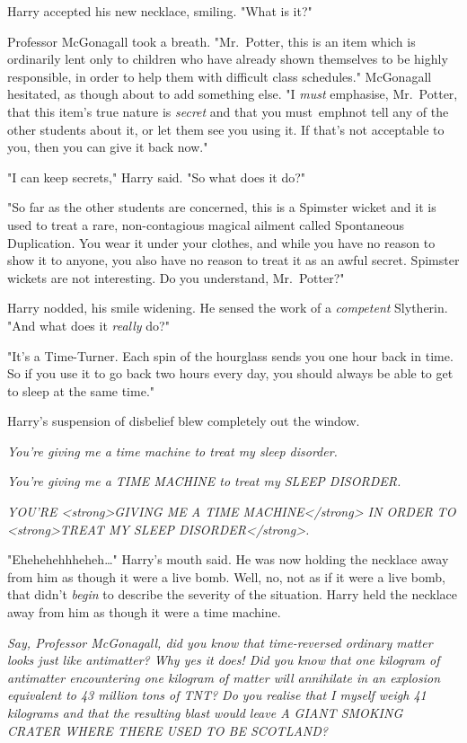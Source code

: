 Harry accepted his new necklace, smiling. "What is it?"

Professor McGonagall took a breath. "Mr.~Potter, this is an item which is 
ordinarily lent only to children who have already shown themselves to be highly 
responsible, in order to help them with difficult class schedules." McGonagall 
hesitated, as though about to add something else. "I \emph{must} emphasise, 
Mr.~Potter, that this item's true nature is \emph{secret} and that you 
must\ emph{not} tell any of the other students about it, or let them see you 
using it. If that's not acceptable to you, then you can give it back now."

"I can keep secrets," Harry said. "So what does it do?"

"So far as the other students are concerned, this is a Spimster wicket and it 
is used to treat a rare, non-contagious magical ailment called Spontaneous 
Duplication. You wear it under your clothes, and while you have no reason to 
show it to anyone, you also have no reason to treat it as an awful secret. 
Spimster wickets are not interesting. Do you understand, Mr.~Potter?"

Harry nodded, his smile widening. He sensed the work of a \emph{competent} 
Slytherin. "And what does it \emph{really} do?"

"It's a Time-Turner. Each spin of the hourglass sends you one hour back in 
time. So if you use it to go back two hours every day, you should always be 
able to get to sleep at the same time."

Harry's suspension of disbelief blew completely out the window.

\emph{You're giving me a time machine to treat my sleep disorder.}

\emph{You're giving me a TIME MACHINE to treat my SLEEP DISORDER.}

\emph{YOU'RE <strong>GIVING ME A TIME MACHINE</strong> IN ORDER TO 
<strong>TREAT MY SLEEP DISORDER</strong>.}

"Ehehehehhheheh{\ldots}" Harry's mouth said. He was now holding the necklace 
away from him as though it were a live bomb. Well, no, not as if it were a live 
bomb, that didn't \emph{begin} to describe the severity of the situation. Harry 
held the necklace away from him as though it were a time machine.

\emph{Say, Professor McGonagall, did you know that time-reversed ordinary 
matter looks just like antimatter? Why yes it does! Did you know that one 
kilogram of antimatter encountering one kilogram of matter will annihilate in 
an explosion equivalent to 43 million tons of TNT? Do you realise that I myself 
weigh 41 kilograms and that the resulting blast would leave A GIANT SMOKING 
CRATER WHERE THERE USED TO BE SCOTLAND?}

